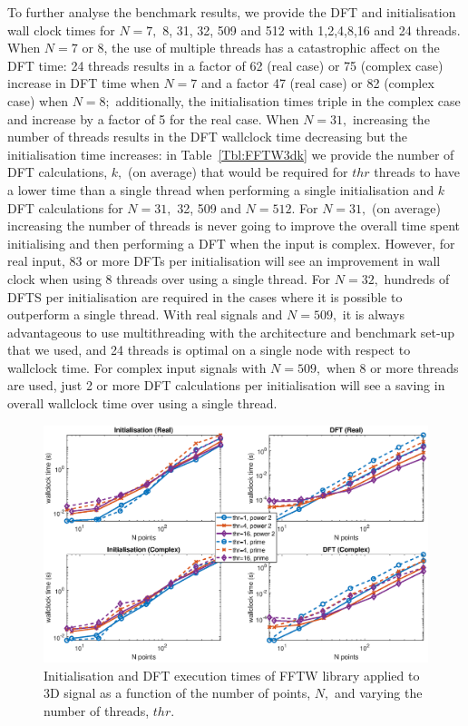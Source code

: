 \documentclass[a4paper]{article}
\begin{document}
To further analyse the benchmark results, we provide the DFT and
initialisation wall clock times for $N=7,$ 8, 31, 32, 509 and 512 with
1,2,4,8,16 and 24 threads. When $N=7$ or 8, the use of multiple
threads has a catastrophic affect on the DFT time: 24 threads results
in a factor of 62 (real case) or 75 (complex case) increase in DFT
time when $N=7$ and a factor 47 (real case) or 82 (complex case) when
$N=8;$ additionally, the initialisation times triple in the complex
case and increase by a factor of 5 for the real case. When $N=31,$
increasing the number of threads results in the DFT wallclock time
decreasing but the initialisation time increases: in
Table~\ref{Tbl:FFTW3dk} we provide the number of DFT calculations,
$k,$ (on average) that would be required for $thr$ threads to have a
lower time than a single thread when performing a single
initialisation and $k$ DFT calculations for $N=31,$ 32, 509 and
$N=512.$ For $N=31,$ (on average) increasing the number of threads is
never going to improve the overall time spent initialising and then
performing a DFT when the input is complex. However, for real input,
83 or more DFTs per initialisation will see an improvement in wall
clock when using 8 threads over using a single thread. For $N=32,$
hundreds of DFTS per initialisation are required in the cases where it
is possible to outperform a single thread. With real signals and
$N=509,$ it is always advantageous to use multithreading with the
architecture and benchmark set-up that we used, and 24 threads is
optimal on a single node with respect to wallclock time. For complex
input signals with $N=509,$ when 8 or more threads are used, just 2 or
more DFT calculations per initialisation will see a saving in overall
wallclock time over using a single thread.

\begin{figure}[htb]
    \centering
    \includegraphics[width=\linewidth]{../results/fftw_3d_thr.eps}
  \caption{Initialisation and DFT execution times of FFTW library applied to 3D signal as a function of the
    number of points, $N,$ and varying the number of threads, $thr.$ }
  \label{3DFFTW}
\end{figure}
\end{document}
